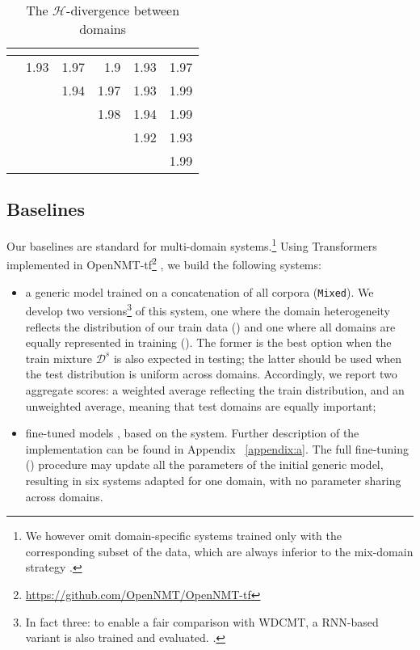\begin{table}\centering
  \begin{tabular}{|l*{5}{|r}|} 
   &  &  &  &  &  \\ \hline
     &1.93 &1.97 &1.9 &1.93 &1.97 \\
       && 1.94 & 1.97 &1.93 & 1.99 \\
     &&&1.98 &1.94 &1.99 \\
       &&&&1.92 &1.93 \\
          &&&&& 1.99 \\ \hline
  \end{tabular}
  \caption{The $\mathcal{H}$-divergence between domains}
  \label{tab:domaindist-chap4}
\end{table}

\subsection{Baselines \label{ssec:baselines-chap4}}

Our baselines are standard for multi-domain systems.\footnote{We however omit domain-specific systems trained only with the corresponding subset of the data, which are always inferior to the mix-domain strategy \citep{Britz17effective}.} Using Transformers implemented in OpenNMT-tf\footnote{\url{https://github.com/OpenNMT/OpenNMT-tf}} \citep{Klein17opennmt}, we build the following systems:

\begin{itemize}
\item a generic model trained on a concatenation of all corpora (\texttt{Mixed}). We develop two versions\footnote{In fact three: to enable a fair comparison with WDCMT, a RNN-based variant is also trained and evaluated. .} of this system, one where the domain heterogeneity reflects the distribution of our train data  () and one where all domains are equally represented in training (). The former is the best option when the train mixture $\mathcal{D}^s$ is also expected in testing; the latter should be used when the test distribution is uniform across domains. Accordingly, we report two aggregate scores: a weighted average reflecting the train distribution, and an unweighted average, meaning that test domains are equally important;
\item fine-tuned models \citep{Luong15stanford,Freitag16fast}, based on the  system. Further description of the implementation can be found in Appendix ~\ref{appendix:a}. The full fine-tuning () procedure may update all the parameters of the initial generic model, resulting in six systems adapted for one domain, with no parameter sharing across domains.
\end{itemize}

